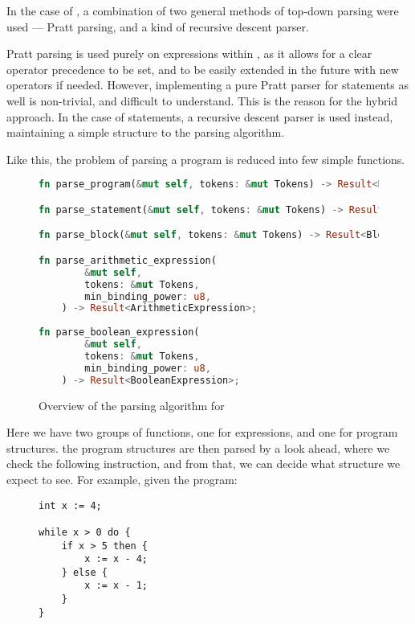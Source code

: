 In the case of \rimp, a combination of two general methods of top-down parsing were used — Pratt parsing, and a kind of recursive descent parser.

Pratt parsing is used purely on expressions within \rimp, as it allows for a clear operator precedence to be set, and to be easily extended in the future with new operators if needed. However, implementing a pure Pratt parser for statements as well is non-trivial, and difficult to understand. This is the reason for the hybrid approach. In the case of statements, a recursive descent parser is used instead, maintaining a simple structure to the parsing algorithm.

Like this, the problem of parsing a \rimplang program is reduced into few simple functions.

\begin{figure}[ht]
    \centering
    \begin{lstlisting}[language=rust,label={lst:parser}, basicstyle=\small]
fn parse_program(&mut self, tokens: &mut Tokens) -> Result<Program>;

fn parse_statement(&mut self, tokens: &mut Tokens) -> Result<Statement>;

fn parse_block(&mut self, tokens: &mut Tokens) -> Result<Block>;

fn parse_arithmetic_expression(
        &mut self,
        tokens: &mut Tokens,
        min_binding_power: u8,
    ) -> Result<ArithmeticExpression>;
    
fn parse_boolean_expression(
        &mut self,
        tokens: &mut Tokens,
        min_binding_power: u8,
    ) -> Result<BooleanExpression>;
    \end{lstlisting}
    \caption{Overview of the parsing algorithm for \rimp}
    \label{fig:parser}
\end{figure}

Here we have two groups of functions, one for expressions, and one for program structures.
the program structures are then parsed by a look ahead, where we check the following instruction, and from that, we can decide what structure we expect to see.
For example, given the program:

\begin{figure}[ht]
    \centering
    \begin{lstlisting}[label={lst:example_parse}, basicstyle=\small]
int x := 4;

while x > 0 do {
    if x > 5 then {
        x := x - 4;
    } else {
        x := x - 1;
    }
}
    \end{lstlisting}
    \label{fig:example_parse}
\end{figure}

